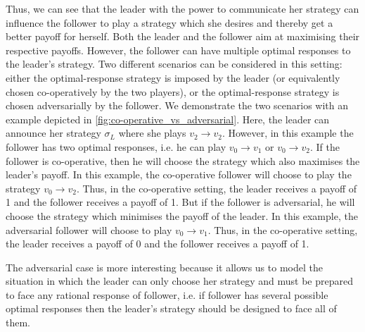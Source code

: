 Thus, we can see that the leader with the power to communicate her strategy can influence the follower to play a strategy which she desires and thereby get a better payoff for herself. Both the leader and the follower aim at maximising their respective payoffs. However, the follower can have multiple optimal responses to the leader's strategy. Two different scenarios can be considered in this setting: either the optimal-response strategy is imposed by the leader (or equivalently chosen co-operatively by the two players), or the optimal-response strategy is chosen adversarially by the follower. We demonstrate the two scenarios with an example depicted in \cref{fig:co-operative_vs_adversarial}. Here, the leader can announce her strategy $\sigma_L$ where she plays $v_2 \to v_2$. However, in this example the follower has two optimal responses, i.e. he can play $v_0 \to v_1$ or $v_0 \to v_2$. If the follower is co-operative, then he will choose the strategy which also maximises the leader's payoff. In this example, the co-operative follower will choose to play the strategy $v_0 \to v_2$. Thus, in the co-operative setting, the leader receives a payoff of 1 and the follower receives a payoff of 1. But if the follower is adversarial, he will choose the strategy which minimises the payoff of the leader. In this example, the adversarial follower will choose to play $v_0 \to v_1$. Thus, in the co-operative setting, the leader receives a payoff of 0 and the follower receives a payoff of 1.

The adversarial case is more interesting because it allows us to model the situation in which the leader can only choose her strategy and must be prepared to face any rational response of follower, i.e. if follower has several possible optimal responses then the leader's strategy should be designed to face all of them.


